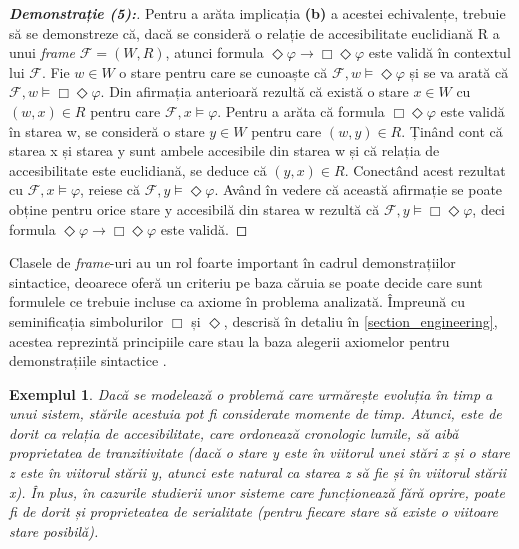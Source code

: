 \documentclass[12pt, openany]{book}
\newtheorem{example}[definition]{Exemplul} %
\newcommand{\mysectionreference}[1]{\autoref{#1}}
\begin{document}
\begin{proof}[\textbf{Demonstrație (5):}]
                Pentru a arăta implicația \textbf{(b)} a acestei echivalențe, trebuie să se demonstreze că, dacă se consideră
                o relație de accesibilitate euclidiană R a unui \textit{frame} $\mathcal{F}=(W,R)$, atunci formula 
                $\Diamond \varphi \rightarrow \Box \Diamond \varphi$ este validă în contextul lui $\mathcal{F}$. Fie $w \in 
                W$ o stare pentru care se cunoaște că $\mathcal{F},w \vDash \Diamond \varphi$ și se va arată că 
                $\mathcal{F},w \vDash \Box \Diamond \varphi$. Din afirmația anterioară rezultă că există o stare $x \in W$ 
                cu $(w,x) \in R$ pentru care $\mathcal{F},x \vDash \varphi$. Pentru a arăta că formula $\Box \Diamond 
                \varphi$ este validă în starea w, se consideră o stare $y \in W$ pentru care $(w,y) \in R$. Ținând cont că
                starea x și starea y sunt ambele accesibile din starea w și că relația de accesibilitate este euclidiană, se
                deduce că $(y,x) \in R$. Conectând acest rezultat cu $\mathcal{F},x \vDash \varphi$, reiese că 
                $\mathcal{F},y \vDash \Diamond \varphi$. Având în vedere că această afirmație se poate obține pentru orice 
                stare y accesibilă din starea w rezultă că $\mathcal{F},y \vDash \Box \Diamond \varphi$, deci formula 
                $\Diamond \varphi \rightarrow \Box \Diamond \varphi$ este validă.
            \end{proof}

            \par{}
                Clasele de \textit{frame}-uri au un rol foarte important în cadrul demonstrațiilor sintactice, deoarece 
                oferă un criteriu pe baza căruia se poate decide care sunt formulele ce trebuie incluse ca axiome în 
                problema analizată. Împreună cu seminificația simbolurilor $\Box$ și $\Diamond$, descrisă în detaliu în 
                \mysectionreference{section_engineering}, acestea reprezintă principiile care stau la baza 
                alegerii axiomelor pentru demonstrațiile sintactice \cite{lecture_notes_hedin}. 
            
            \begin{example}
                Dacă se modelează o problemă care urmărește evoluția în timp a unui sistem, stările acestuia pot fi 
                considerate momente de timp. Atunci, este de dorit ca relația de accesibilitate, care ordonează 
                cronologic lumile, să aibă proprietatea de tranzitivitate (dacă o stare y este în viitorul unei stări x 
                și o stare z este în viitorul stării y, atunci este natural ca starea z să fie și în viitorul stării x). 
                În plus, în cazurile studierii unor sisteme care funcționează fără oprire, poate fi de dorit și 
                proprieteatea de serialitate (pentru fiecare stare să existe o viitoare stare posibilă).
            \end{example}
\end{document}
